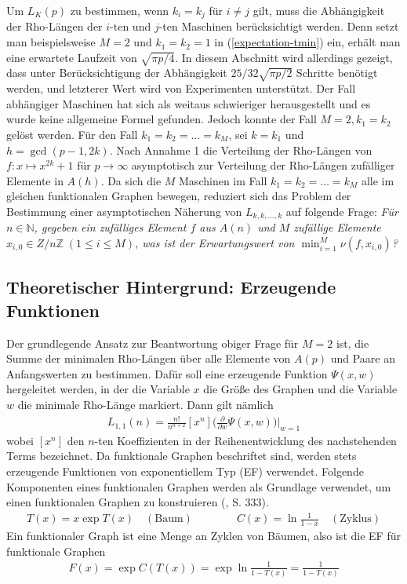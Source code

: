\documentclass[a4paper, 10pt, ngerman]{article}
\newcommand{\N}{\mathbb{N}}
\newcommand{\Z}{\mathbb{Z}}
\begin{document}
Um $L_K(p)$ zu bestimmen, wenn $k_i = k_j$ für $i \ne j$ gilt, muss die Abhängigkeit der Rho-Längen der $i$-ten und $j$-ten Maschinen berücksichtigt werden. Denn setzt man beispielsweise $M = 2$ und $k_1 = k_2 = 1$ in (\ref{expectation-tmin}) ein, erhält man eine erwartete Laufzeit von $\sqrt {\pi p / 4}$. In diesem Abschnitt wird allerdings gezeigt, dass unter Berücksichtigung der Abhängigkeit $25/32 \sqrt{\pi p / 2}$ Schritte benötigt werden, und letzterer Wert wird von Experimenten unterstützt. Der Fall abhängiger Maschinen hat sich als weitaus schwieriger herausgestellt und es wurde keine allgemeine Formel gefunden. Jedoch konnte der Fall $M = 2, k_1 = k_2$ gelöst werden. Für den Fall $k_1 = k_2 = \dots = k_M$, sei $k = k_1$ und $h = \gcd(p - 1, 2k)$. Nach Annahme 1 die Verteilung der Rho-Längen von $f : x \mapsto x^{2k} + 1$ für $p \to \infty$ asymptotisch zur Verteilung der Rho-Längen zufälliger Elemente in $A(h)$. Da sich die $M$ Maschinen im Fall $k_1 = k_2 = \dots = k_M$ alle im gleichen funktionalen Graphen bewegen, reduziert sich das Problem der Bestimmung einer asymptotischen Näherung von $L_{k, k, \dots, k}$ auf folgende Frage: \emph{Für $n \in \N$, gegeben ein zufälliges Element $f$ aus $A(n)$ und $M$ zufällige Elemente $x_{i, 0} \in Z/n\Z \; (1 \le i \le M)$, was ist der Erwartungswert von $\min_{i = 1}^M \nu(f, x_{i, 0})$?}

\subsection{Theoretischer Hintergrund: Erzeugende Funktionen}

Der grundlegende Ansatz zur Beantwortung obiger Frage für $M = 2$ ist, die Summe der minimalen Rho-Längen über alle Elemente von $A(p)$ und Paare an Anfangswerten zu bestimmen. Dafür soll eine erzeugende Funktion $\Psi(x, w)$ hergeleitet werden, in der die Variable $x$ die Größe des Graphen und die Variable $w$ die minimale Rho-Länge markiert. Dann gilt nämlich
\begin{align*}
    L_{1, 1}(n) = \frac {n!}{n^{n + 2}} [x^n] \Bigg (\frac {\partial} {\partial w} \Psi(x, w) \Bigg ) \Bigg \vert_{w = 1}
\end{align*}
wobei $[x^n]$ den $n$-ten Koeffizienten in der Reihenentwicklung des nachstehenden Terms bezeichnet. Da funktionale Graphen beschriftet sind, werden stets erzeugende Funktionen von exponentiellem Typ (EF) verwendet. Folgende Komponenten eines funktionalen Graphen werden als Grundlage verwendet, um einen funktionalen Graphen zu konstruieren (\cite{fo90}, S. 333).
\begin{align*}
    T(x) = x \exp T(x) \quad (\text{Baum}) \qquad\qquad C(x) = \ln \frac {1} {1 - x} \quad (\text{Zyklus})
\end{align*}
Ein funktionaler Graph ist eine Menge an Zyklen von Bäumen, also ist die EF für funktionale Graphen
\begin{align*}
    F(x) = \exp C(T(x)) = \exp \ln \frac 1 {1 - T(x)} = \frac 1 {1 - T(x)}
\end{align*}
\end{document}
